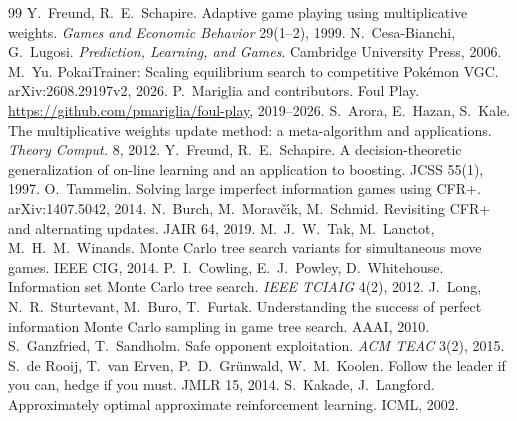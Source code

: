 \documentclass[10pt]{article}
\theoremstyle{tplain}
\theoremstyle{tdef}
\theoremstyle{trem}
\begin{document}
\begingroup\footnotesize
\begin{thebibliography}{99}
\setlength{\itemsep}{1pt}\setlength{\parsep}{0pt}
 Y.~Freund, R.~E.~Schapire. Adaptive game playing using multiplicative weights. \emph{Games and Economic Behavior} 29(1--2), 1999.
 N.~Cesa-Bianchi, G.~Lugosi. \emph{Prediction, Learning, and Games}. Cambridge University Press, 2006.
 M.~Yu. PokaiTrainer: Scaling equilibrium search to competitive Pok\'emon VGC. arXiv:2608.29197v2, 2026.
 P.~Mariglia and contributors. Foul Play. \url{https://github.com/pmariglia/foul-play}, 2019--2026.
 S.~Arora, E.~Hazan, S.~Kale. The multiplicative weights update method: a meta-algorithm and applications. \emph{Theory Comput.} 8, 2012.
 Y.~Freund, R.~E.~Schapire. A decision-theoretic generalization of on-line learning and an application to boosting. JCSS 55(1), 1997.
 O.~Tammelin. Solving large imperfect information games using CFR+. arXiv:1407.5042, 2014.
 N.~Burch, M.~Morav\v{c}\'{\i}k, M.~Schmid. Revisiting CFR+ and alternating updates. JAIR 64, 2019.
 M.~J.~W.~Tak, M.~Lanctot, M.~H.~M.~Winands. Monte Carlo tree search variants for simultaneous move games. IEEE CIG, 2014.
 P.~I.~Cowling, E.~J.~Powley, D.~Whitehouse. Information set Monte Carlo tree search. \emph{IEEE TCIAIG} 4(2), 2012.
 J.~Long, N.~R.~Sturtevant, M.~Buro, T.~Furtak. Understanding the success of perfect information Monte Carlo sampling in game tree search. AAAI, 2010.
 S.~Ganzfried, T.~Sandholm. Safe opponent exploitation. \emph{ACM TEAC} 3(2), 2015.
 S.~de Rooij, T.~van Erven, P.~D.~Gr\"unwald, W.~M.~Koolen. Follow the leader if you can, hedge if you must. JMLR 15, 2014.
 S.~Kakade, J.~Langford. Approximately optimal approximate reinforcement learning. ICML, 2002.
\end{thebibliography}
\endgroup
\end{document}
